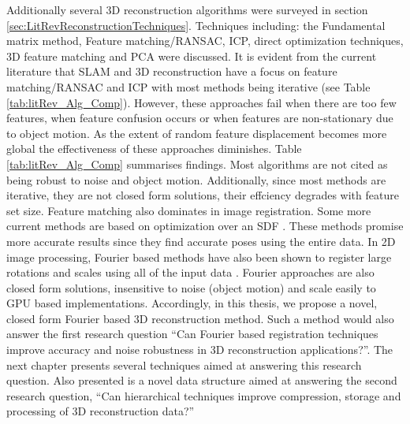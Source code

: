 Additionally several 3D reconstruction algorithms were surveyed in section \ref{sec:LitRevReconstructionTechniques}. Techniques including: the Fundamental matrix method, Feature matching/RANSAC, ICP, direct optimization techniques, 3D feature matching and PCA were discussed. It is evident from the current literature that SLAM and 3D reconstruction have a focus on feature matching/RANSAC and ICP with most methods being iterative (see Table \ref{tab:litRev_Alg_Comp}). However, these approaches fail when there are too few features, when feature confusion occurs or when features are non-stationary due to object motion. As the extent of random feature displacement becomes more global the effectiveness of these approaches diminishes. Table \ref{tab:litRev_Alg_Comp} summarises findings. Most algorithms are not cited as being robust to noise and object motion. Additionally, since most methods are iterative, they are not closed form solutions, their effciency degrades with feature set size. Feature matching also dominates in image registration. Some more current methods are based on optimization over an SDF \cite{Bylow13Real,Rusinkiewicz02Real}. These methods promise more accurate results since they find accurate poses using the entire data. In 2D image processing, Fourier based methods have also been shown to register large rotations and scales using all of the input data \cite{Gonzalez11Improving}. Fourier approaches are also closed form solutions, insensitive to noise (object motion) and scale easily to GPU based implementations. Accordingly, in this thesis, we propose a novel, closed form Fourier based 3D reconstruction method. Such a method would also answer the first research question ``Can Fourier based registration techniques improve accuracy and noise robustness in 3D reconstruction applications?''. The next chapter presents several techniques aimed at answering this research question. Also presented is a novel data structure aimed at answering the second research question, ``Can hierarchical techniques improve compression, storage and processing of 3D reconstruction data?'' \\
